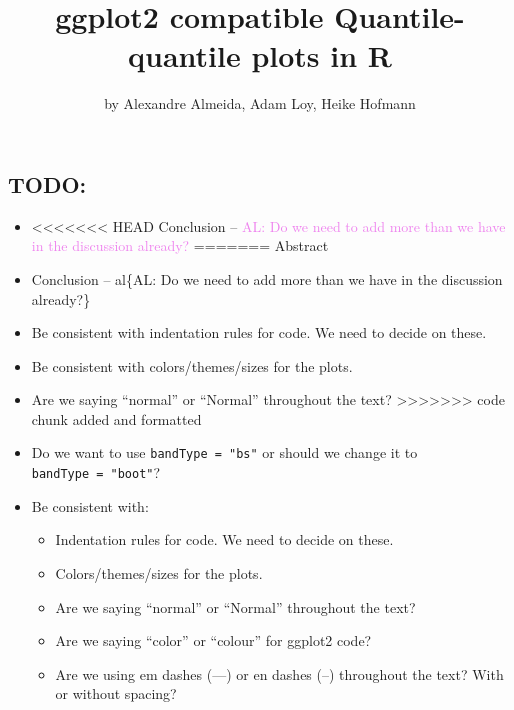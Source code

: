 \title{ggplot2 compatible Quantile-quantile plots in R}
\author{by Alexandre Almeida, Adam Loy, Heike Hofmann}

\maketitle


\newcommand{\hh}[1]{{\textcolor{orange}{#1}}}
\newcommand{\al}[1]{{\textcolor{violet}{#1}}}
\newcommand{\Aa}[1]{{\textcolor{olive}{#1}}}

\subsection{TODO:}\label{todo}

\begin{itemize}
\item
<<<<<<< HEAD
  Conclusion --
  \al{AL: Do we need to add more than we have in the discussion already?}
=======
  Abstract
\item
  Conclusion -- al\{AL: Do we need to add more than we have in the
  discussion already?\}
\item
  Be consistent with indentation rules for code. We need to decide on
  these.
\item
  Be consistent with colors/themes/sizes for the plots.
\item
  Are we saying ``normal'' or ``Normal'' throughout the text?
>>>>>>> code chunk added and formatted
\item
  Do we want to use \texttt{bandType\ =\ "bs"} or should we change it to
  \texttt{bandType\ =\ "boot"}?
\item
  Be consistent with:

  \begin{itemize}
  \tightlist
  \item
    Indentation rules for code. We need to decide on these.
  \item
    Colors/themes/sizes for the plots.
  \item
    Are we saying ``normal'' or ``Normal'' throughout the text?
  \item
    Are we saying ``color'' or ``colour'' for ggplot2 code?
  \item
    Are we using em dashes (---) or en dashes (--) throughout the text?
    With or without spacing?
  \end{itemize}
\end{itemize}

